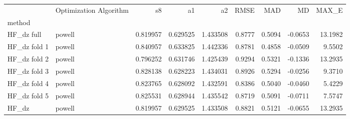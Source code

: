 \begin{tabular}{llrrrrrrr}
 & Optimization Algorithm & s8 & a1 & a2 & RMSE & MAD & MD & MAX_E \\
method &  &  &  &  &  &  &  &  \\
HF_dz full & powell & 0.819957 & 0.629525 & 1.433508 & 0.8777 & 0.5094 & -0.0653 & 13.1982 \\
HF_dz fold 1 & powell & 0.840957 & 0.633825 & 1.442336 & 0.8781 & 0.4858 & -0.0509 & 9.5502 \\
HF_dz fold 2 & powell & 0.796252 & 0.631746 & 1.425439 & 0.9294 & 0.5321 & -0.1336 & 13.2935 \\
HF_dz fold 3 & powell & 0.828138 & 0.628223 & 1.434031 & 0.8926 & 0.5294 & -0.0256 & 9.3710 \\
HF_dz fold 4 & powell & 0.823765 & 0.628092 & 1.432591 & 0.8386 & 0.5040 & -0.0460 & 5.4229 \\
HF_dz fold 5 & powell & 0.825531 & 0.628944 & 1.435542 & 0.8719 & 0.5091 & -0.0711 & 7.5747 \\
HF_dz & powell & 0.819957 & 0.629525 & 1.433508 & 0.8821 & 0.5121 & -0.0655 & 13.2935 \\
\end{tabular}
